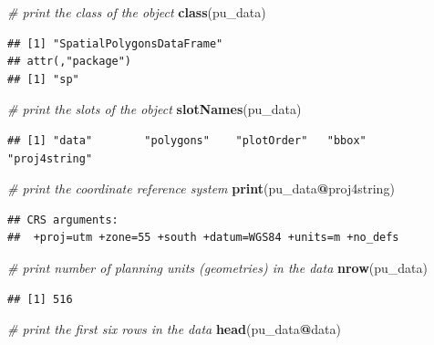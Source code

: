 \documentclass[
  12pt,
]{book}
\newenvironment{Shaded}{\begin{snugshade}}{\end{snugshade}}
\newcommand{\CommentTok}[1]{\textcolor[rgb]{0.56,0.35,0.01}{\textit{#1}}}
\newcommand{\KeywordTok}[1]{\textcolor[rgb]{0.13,0.29,0.53}{\textbf{#1}}}
\newcommand{\NormalTok}[1]{#1}
\newcommand{\OperatorTok}[1]{\textcolor[rgb]{0.81,0.36,0.00}{\textbf{#1}}}
\begin{document}
\begin{Shaded}
\begin{Highlighting}[]
\CommentTok{# print the class of the object}
\KeywordTok{class}\NormalTok{(pu_data)}
\end{Highlighting}
\end{Shaded}

\begin{verbatim}
## [1] "SpatialPolygonsDataFrame"
## attr(,"package")
## [1] "sp"
\end{verbatim}

\begin{Shaded}
\begin{Highlighting}[]
\CommentTok{# print the slots of the object}
\KeywordTok{slotNames}\NormalTok{(pu_data)}
\end{Highlighting}
\end{Shaded}

\begin{verbatim}
## [1] "data"        "polygons"    "plotOrder"   "bbox"        "proj4string"
\end{verbatim}

\begin{Shaded}
\begin{Highlighting}[]
\CommentTok{# print the coordinate reference system}
\KeywordTok{print}\NormalTok{(pu_data}\OperatorTok{@}\NormalTok{proj4string)}
\end{Highlighting}
\end{Shaded}

\begin{verbatim}
## CRS arguments:
##  +proj=utm +zone=55 +south +datum=WGS84 +units=m +no_defs
\end{verbatim}

\begin{Shaded}
\begin{Highlighting}[]
\CommentTok{# print number of planning units (geometries) in the data}
\KeywordTok{nrow}\NormalTok{(pu_data)}
\end{Highlighting}
\end{Shaded}

\begin{verbatim}
## [1] 516
\end{verbatim}

\begin{Shaded}
\begin{Highlighting}[]
\CommentTok{# print the first six rows in the data}
\KeywordTok{head}\NormalTok{(pu_data}\OperatorTok{@}\NormalTok{data)}
\end{Highlighting}
\end{Shaded}
\end{document}
